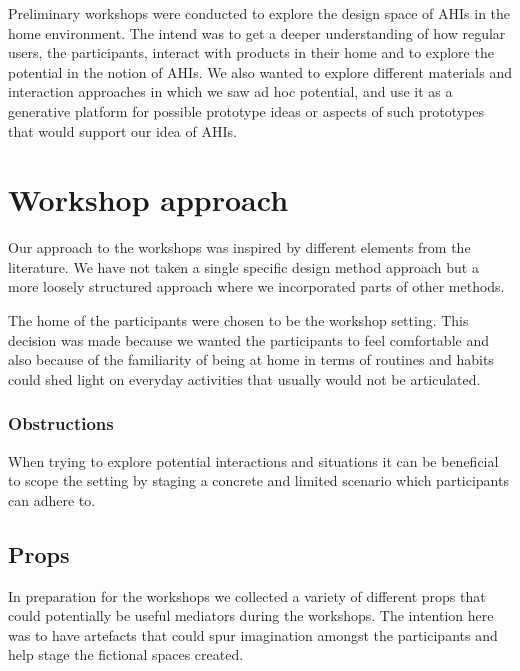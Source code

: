 

Preliminary workshops were conducted to explore the design space of AHIs in the home environment.
The intend was to get a deeper understanding of how regular users, the participants, interact with products in their home and to explore the potential in the notion of AHIs.
We also wanted to explore different materials and interaction approaches in which we saw ad hoc potential, and use it as a generative platform for possible prototype ideas or aspects of such prototypes that would support our idea of AHIs.

\section{Workshop approach}
\label{ch:workshops:approach}
Our approach to the workshops was inspired by different elements from the literature. \todo{\dots}
We have not taken a single specific design method approach but a more loosely structured approach where we incorporated parts of other methods.

The home of the participants were chosen to be the workshop setting.
This decision was made because we wanted the participants to feel comfortable and also because of the familiarity of being at home in terms of routines and habits could shed light on everyday activities that usually would not be articulated.

\subsubsection{Obstructions}
\label{ch:workshops:approach:obstructions}

When trying to explore potential interactions and situations it can be beneficial to scope the setting by staging a concrete and limited scenario which participants can adhere to.







\subsection{Props}
\label{ch:workshops:approach:props}

In preparation for the workshops we collected a variety of different props that could potentially be useful mediators during the workshops.
The intention here was to have artefacts that could spur imagination amongst the participants and help stage the fictional spaces created.

